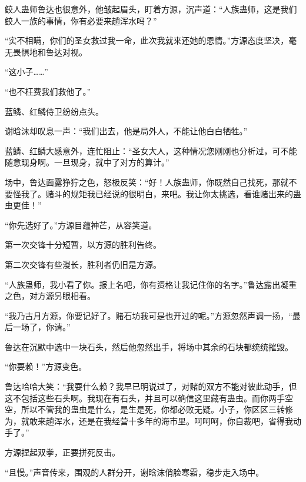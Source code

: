 \begin{this_body}
鲛人蛊师鲁达也很意外，他皱起眉头，盯着方源，沉声道：“人族蛊师，这是我们鲛人一族的事情，你有必要来趟浑水吗？”

“实不相瞒，你们的圣女救过我一命，此次我就来还她的恩情。”方源态度坚决，毫无畏惧地和鲁达对视。

“这小子……”

“也不枉费我们救他了。”

蓝鳞、红鳞侍卫纷纷点头。

谢晗沫却叹息一声：“我们出去，他是局外人，不能让他白白牺牲。”

蓝鳞、红鳞大感意外，连忙阻止：“圣女大人，这种情况您刚刚也分析过，可不能随意现身啊。一旦现身，就中了对方的算计。”

场中，鲁达面露狰狞之色，怒极反笑：“好！人族蛊师，你既然自己找死，那就不要怪我了。赌斗的规矩我已经说的很明白，来吧。我让你太挑选，看谁赌出来的蛊虫更佳！”

“你先选好了。”方源目蕴神芒，从容笑道。

第一次交锋十分短暂，以方源的胜利告终。

第二次交锋有些漫长，胜利者仍旧是方源。

“人族蛊师，我小看了你。报上名吧，你有资格让我记住你的名字。”鲁达露出凝重之色，对方源另眼相看。

“我乃古月方源，你要记好了。赌石坊我可是也开过的呢。”方源忽然声调一扬，“最后一场了，你请。”

鲁达在沉默中选中一块石头，然后他忽然出手，将场中其余的石块都统统摧毁。

“你耍赖！”方源变色。

鲁达哈哈大笑：“我耍什么赖？我早已明说过了，对赌的双方不能对彼此动手，但这不包括这些石头啊。我现在有石头，并且可以确信这里藏有蛊虫。而你两手空空，所以不管我的蛊虫是什么，是生是死，你都必败无疑。小子，你区区三转修为，就敢来趟浑水，还是在我经营十多年的海市里。呵呵呵，你自裁吧，省得我动手了。”

方源捏起双拳，正要拼死反击。

“且慢。”声音传来，围观的人群分开，谢晗沫俏脸寒霜，稳步走入场中。

\end{this_body}


